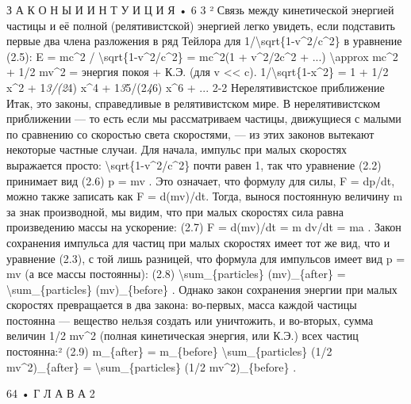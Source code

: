 \documentclass[10pt,oneside]{article}
\begin{document}
З А К О Н Ы  И  И Н Т У И Ц И Я • 6 3 ² Связь между кинетической энергией частицы и её полной (релятивистской) энергией легко увидеть, если подставить первые два члена разложения в ряд Тейлора для 1/\textbackslash{}sqrt\{1-v\textasciicircum{}2/c\textasciicircum{}2\} в уравнение (2.5): E = mc\textasciicircum{}2 / \textbackslash{}sqrt\{1-v\textasciicircum{}2/c\textasciicircum{}2\} = mc\textasciicircum{}2(1 + v\textasciicircum{}2/2c\textasciicircum{}2 + ...) \textbackslash{}approx mc\textasciicircum{}2 + 1/2 mv\textasciicircum{}2 = энергия покоя + К.Э. (для v << c). 1/\textbackslash{}sqrt\{1-x\textasciicircum{}2\} = 1 + 1/2 x\textasciicircum{}2 + 1\emph{3/(2}4) x\textasciicircum{}4 + 1\emph{3}5/(2\emph{4}6) x\textasciicircum{}6 + ... 2-2 Нерелятивистское приближение Итак, это законы, справедливые в релятивистском мире. В нерелятивистском приближении --- то есть если мы рассматриваем частицы, движущиеся с малыми по сравнению со скоростью света скоростями, --- из этих законов вытекают некоторые частные случаи. Для начала, импульс при малых скоростях выражается просто: \textbackslash{}sqrt\{1-v\textasciicircum{}2/c\textasciicircum{}2\} почти равен 1, так что уравнение (2.2) принимает вид (2.6) p = mv . Это означает, что формулу для силы, F = dp/dt, можно также записать как F = d(mv)/dt. Тогда, вынося постоянную величину m за знак производной, мы видим, что при малых скоростях сила равна произведению массы на ускорение: (2.7) F = d(mv)/dt = m dv/dt = ma . Закон сохранения импульса для частиц при малых скоростях имеет тот же вид, что и уравнение (2.3), с той лишь разницей, что формула для импульсов имеет вид p = mv (а все массы постоянны): (2.8) \textbackslash{}sum\_\{particles\} (mv)\_\{after\} = \textbackslash{}sum\_\{particles\} (mv)\_\{before\} . Однако закон сохранения энергии при малых скоростях превращается в два закона: во-первых, масса каждой частицы постоянна --- вещество нельзя создать или уничтожить, и во-вторых, сумма величин 1/2 mv\textasciicircum{}2 (полная кинетическая энергия, или К.Э.) всех частиц постоянна:² (2.9) m\_\{after\} = m\_\{before\} \textbackslash{}sum\_\{particles\} (1/2 mv\textasciicircum{}2)\_\{after\} = \textbackslash{}sum\_\{particles\} (1/2 mv\textasciicircum{}2)\_\{before\} .\par

64 • Г Л А В А  2\par
\end{document}
